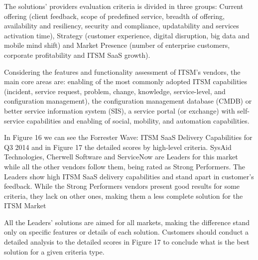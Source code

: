 The solutions' providers evaluation criteria is divided in three groups: Current offering (client feedback, scope of predefined service, breadth of offering, availability and resiliency, security and compliance, updatability and services activation time), Strategy (customer experience, digital disruption, big data and mobile mind shift) and Market Presence (number of enterprise customers, corporate profitability and ITSM SaaS growth).\par
Considering the features and functionality assessment of ITSM's vendors, the main core areas are: enabling of the most commonly adopted ITSM capabilities (incident, service request, problem, change, knowledge, service-level, and configuration management), the configuration management database (CMDB) or better service information system (SIS), a service portal (or exchange) with self-service capabilities and enabling of social, mobility, and automation capabilities.\par
In Figure 16 we can see the Forrester Wave: ITSM SaaS Delivery Capabilities for Q3 2014 and in Figure 17 the detailed scores by high-level criteria. SysAid Technologies, Cherwell Software and ServiceNow are Leaders for this market while all the other vendors follow them, being rated as Strong Performers. The Leaders show high ITSM SaaS delivery capabilities and stand apart in customer's feedback. While the Strong Performers vendors present good results for some criteria, they lack on other ones, making them a less complete solution for the ITSM Market\par
All the Leaders' solutions are aimed for all markets, making the difference stand only on specific features or details of each solution. Customers should conduct a detailed analysis to the detailed scores in Figure 17 to conclude what is the best solution for a given criteria type.\par


